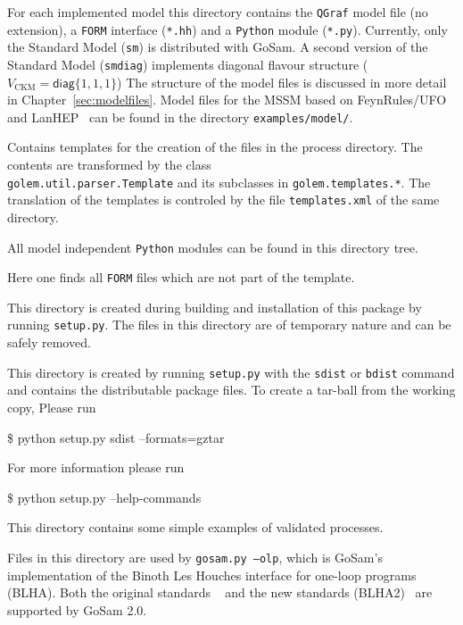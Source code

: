 \documentclass[11pt,a4paper]{refrep}
\newcommand{\gosamversion}{{2{.}0}}
\newcommand{\gosamv}[1][\gosamversion]{{\sc GoSam}\xspace}
\newcommand{\qgraf}{{\tt QGraf}\xspace}
\newcommand{\form}{{\tt FORM}\xspace}
\newcommand{\python}{{\tt Python}\xspace}
\begin{document}
 For each implemented model this directory
contains the \qgraf model file (no extension), a \form interface
(\texttt{*.hh}) and a \python module (\texttt{*.py}). Currently,
only the Standard Model (\texttt{sm}) is distributed with \gosamv.
A second version of the Standard Model (\texttt{smdiag}) implements
diagonal flavour structure ($V_{\text{CKM}}=\mathsf{diag}\{1,1,1\}$)
The structure of the model files is discussed in more detail in
Chapter~\ref{sec:modelfiles}. Model files for the MSSM based on 
FeynRules/UFO~\cite{Degrande:2011ua}  and LanHEP~\cite{Semenov:2010qt}
can be found in the directory 
\texttt{examples/model/}.

 Contains templates for the creation
of the files in the process directory. The contents are transformed
by the class\\
\texttt{golem.util.parser.Template} and its subclasses
in \texttt{golem.templates.*}. The translation of the templates is
controled by the file \texttt{templates.xml} of the same directory.

 All model independent \python modules
can be found in this directory tree.

 Here one finds all \form files
which are not part of the template.

 This directory is created during
building and installation of this package by running \texttt{setup.py}.
The files in this directory are of temporary nature and can be safely
removed.

 This directory is created by running
\texttt{setup.py} with the \texttt{sdist} or \texttt{bdist} command
and contains the distributable package files.
To create a tar-ball from the working copy, Please run
\begin{example}
\$ python setup.py sdist --formats=gztar
\end{example}
For more information
please run
\begin{example}
\$ python setup.py --help-commands
\end{example}

 This directory contains some simple examples
of validated processes.

 Files in this directory are used by
\texttt{gosam.py --olp}, which is \gosamv's implementation of the
Binoth Les Houches interface for one-loop programs (BLHA).
Both the original standards ~\cite{Binoth:2010xt} and the new standards 
(BLHA2)~\cite{Alioli:2013nda} are supported by \gosamv2.0.
\end{document}
